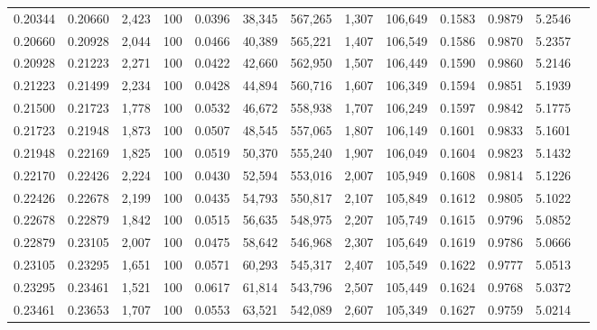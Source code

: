\begin{tabular}{rrrrrrrrrrrrr}
0.20344 & 0.20660 & 2,423 & 100 &                                     0.0396 &  38,345 & 567,265 &   1,307 & 106,649 & 0.1583 & 0.9879 & 5.2546 \\
0.20660 & 0.20928 & 2,044 & 100 &                                     0.0466 &  40,389 & 565,221 &   1,407 & 106,549 & 0.1586 & 0.9870 & 5.2357 \\
0.20928 & 0.21223 & 2,271 & 100 &                                     0.0422 &  42,660 & 562,950 &   1,507 & 106,449 & 0.1590 & 0.9860 & 5.2146 \\
0.21223 & 0.21499 & 2,234 & 100 &                                     0.0428 &  44,894 & 560,716 &   1,607 & 106,349 & 0.1594 & 0.9851 & 5.1939 \\
0.21500 & 0.21723 & 1,778 & 100 &                                     0.0532 &  46,672 & 558,938 &   1,707 & 106,249 & 0.1597 & 0.9842 & 5.1775 \\
0.21723 & 0.21948 & 1,873 & 100 &                                     0.0507 &  48,545 & 557,065 &   1,807 & 106,149 & 0.1601 & 0.9833 & 5.1601 \\
0.21948 & 0.22169 & 1,825 & 100 &                                     0.0519 &  50,370 & 555,240 &   1,907 & 106,049 & 0.1604 & 0.9823 & 5.1432 \\
0.22170 & 0.22426 & 2,224 & 100 &                                     0.0430 &  52,594 & 553,016 &   2,007 & 105,949 & 0.1608 & 0.9814 & 5.1226 \\
0.22426 & 0.22678 & 2,199 & 100 &                                     0.0435 &  54,793 & 550,817 &   2,107 & 105,849 & 0.1612 & 0.9805 & 5.1022 \\
0.22678 & 0.22879 & 1,842 & 100 &                                     0.0515 &  56,635 & 548,975 &   2,207 & 105,749 & 0.1615 & 0.9796 & 5.0852 \\
0.22879 & 0.23105 & 2,007 & 100 &                                     0.0475 &  58,642 & 546,968 &   2,307 & 105,649 & 0.1619 & 0.9786 & 5.0666 \\
0.23105 & 0.23295 & 1,651 & 100 &                                     0.0571 &  60,293 & 545,317 &   2,407 & 105,549 & 0.1622 & 0.9777 & 5.0513 \\
0.23295 & 0.23461 & 1,521 & 100 &                                     0.0617 &  61,814 & 543,796 &   2,507 & 105,449 & 0.1624 & 0.9768 & 5.0372 \\
0.23461 & 0.23653 & 1,707 & 100 &                                     0.0553 &  63,521 & 542,089 &   2,607 & 105,349 & 0.1627 & 0.9759 & 5.0214 \\

\end{tabular}

